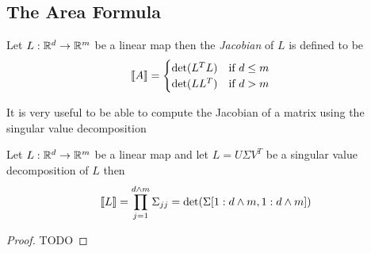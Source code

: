 \subsection{The Area Formula}

\begin{defn}Let $L : \mathbb{R}^d \to \mathbb{R}^m$ be a linear map then the \emph{Jacobian} of $L$ is defined to be
\begin{align*}
\llbracket A \rrbracket &= \begin{cases}
\det(L^T L) & \text{if $d \leq m$} \\
\det(L L^T) & \text{if $d > m$} \\
\end{cases}
\end{align*}
\end{defn}

It is very useful to be able to compute the Jacobian of a matrix using the singular value decomposition
\begin{lem}\label{JacobianViaSVD}Let $L : \mathbb{R}^d \to \mathbb{R}^m$ be a linear map and let $L=U \Sigma V^T$ be a
singular value decomposition of $L$ then 
\begin{align*}
\llbracket L \rrbracket = \prod_{j=1}^{d \wedge m} \Sigma_{jj} = \det(\Sigma[1:d \wedge m, 1:d \wedge m])
\end{align*}
\end{lem}
\begin{proof}
TODO
\end{proof}

